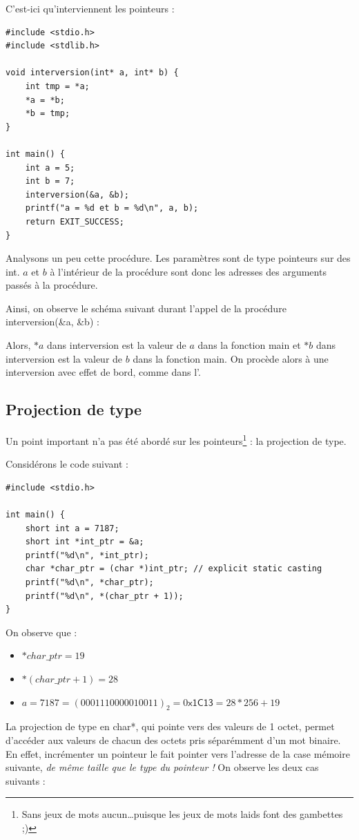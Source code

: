 \documentclass[../../../main.tex]{subfiles}
\begin{document}
C'est-ici qu'interviennent les pointeurs :
\begin{verbatim}
#include <stdio.h>
#include <stdlib.h>

void interversion(int* a, int* b) {
	int tmp = *a;
	*a = *b;
	*b = tmp;
}

int main() {
	int a = 5;
	int b = 7;
	interversion(&a, &b);
	printf("a = %d et b = %d\n", a, b);
	return EXIT_SUCCESS;
}
\end{verbatim}
Analysons un peu cette procédure. Les paramètres sont de type pointeurs sur des \textsf{int}. $a$ et $b$ à l'intérieur de la procédure sont donc les adresses des arguments passés à la procédure.
 
Ainsi, on observe le schéma suivant durant l'appel de la procédure \textsf{interversion(\&a, \&b)} :  

\begin{minipage}{\textwidth}
	\begin{center}
		
	\end{center}
\end{minipage}
 
Alors, $*a$ dans \textsf{interversion} est la valeur de $a$ dans la fonction \textsf{main} et $*b$ dans \textsf{interversion} est la valeur de $b$ dans la fonction \textsf{main}. On procède alors à une interversion avec effet de bord, comme dans l'.
 
\subsection{Projection de type}
Un point important n'a pas été abordé sur les pointeurs\footnote{Sans jeux de mots aucun\dots puisque les jeux de mots laids font des gambettes ;)} : la projection de type.
 
Considérons le code suivant :
\begin{verbatim}
#include <stdio.h>

int main() {
	short int a = 7187;
	short int *int_ptr = &a;
	printf("%d\n", *int_ptr);
	char *char_ptr = (char *)int_ptr; // explicit static casting
	printf("%d\n", *char_ptr);
	printf("%d\n", *(char_ptr + 1));
}
\end{verbatim}
On observe que :
\begin{itemize}
	\item $*char\_ptr = 19$
	\item $*(char\_ptr + 1) = 28$
	\item $a = 7187 = (0001110000010011)_{2} = 0\textsf{x1C13} = 28 * 256 + 19$
\end{itemize}
La projection de type en \textsf{char*}, qui pointe vers des valeurs de 1 octet, permet d'accéder aux valeurs de chacun des octets pris séparémment d'un mot binaire. En effet, incrémenter un pointeur le fait pointer vers l'adresse de la case mémoire suivante, \textit{de même taille que le type du pointeur !} On observe les deux cas suivants : 
\end{document}
